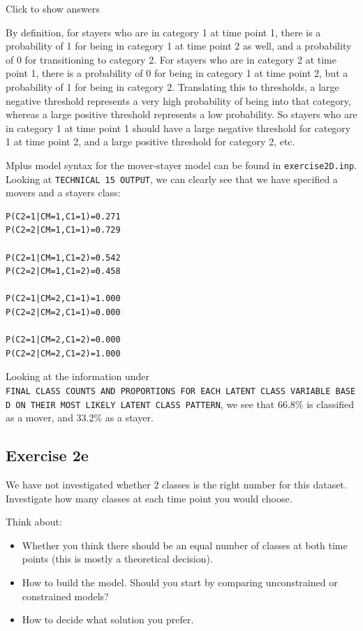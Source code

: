 \documentclass[
]{book}
\providecommand{\tightlist}{%
  \setlength{\itemsep}{0pt}\setlength{\parskip}{0pt}}
\begin{document}
Click to show answers

By definition, for stayers who are in category 1 at time point 1, there is a probability of 1 for being in category 1 at time point 2 as well, and a probability of 0 for transitioning to category 2. For stayers who are in category 2 at time point 1, there is a probability of 0 for being in category 1 at time point 2, but a probability of 1 for being in category 2. Translating this to thresholds, a large negative threshold represents a very high probability of being into that category, whereas a large positive threshold represents a low probability. So stayers who are in category 1 at time point 1 should have a large negative threshold for category 1 at time point 2, and a large positive threshold for category 2, etc.

Mplus model syntax for the mover-stayer model can be found in \texttt{exercise2D.inp}. Looking at \texttt{TECHNICAL\ 15\ OUTPUT}, we can clearly see that we have specified a movers and a stayers class:

\begin{verbatim}
P(C2=1|CM=1,C1=1)=0.271
P(C2=2|CM=1,C1=1)=0.729

P(C2=1|CM=1,C1=2)=0.542
P(C2=2|CM=1,C1=2)=0.458

P(C2=1|CM=2,C1=1)=1.000
P(C2=2|CM=2,C1=1)=0.000

P(C2=1|CM=2,C1=2)=0.000
P(C2=2|CM=2,C1=2)=1.000
\end{verbatim}

Looking at the information under \texttt{FINAL\ CLASS\ COUNTS\ AND\ PROPORTIONS\ FOR\ EACH\ LATENT\ CLASS\ VARIABLE\ BASED\ ON\ THEIR\ MOST\ LIKELY\ LATENT\ CLASS\ PATTERN}, we see that 66.8\% is classified as a mover, and 33.2\% as a stayer.

\hypertarget{exercise-2e}{%
\subsection{Exercise 2e}\label{exercise-2e}}

We have not investigated whether 2 classes is the right number for this dataset. Investigate how many classes at each time point you would choose.

Think about:

\begin{itemize}
\tightlist
\item
  Whether you think there should be an equal number of classes at both time points (this is mostly a theoretical decision).
\item
  How to build the model. Should you start by comparing unconstrained or constrained models?
\item
  How to decide what solution you prefer.
\end{itemize}
\end{document}
